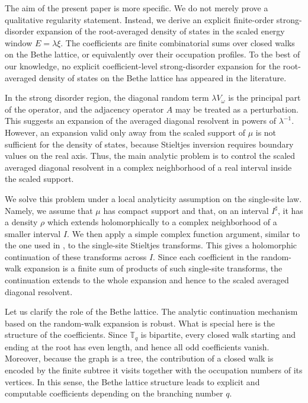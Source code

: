 \documentclass[a4paper,11pt]{article}
\begin{document}
The aim of the present paper is more specific. 
We do not merely prove a qualitative regularity statement. 
Instead, we derive an explicit finite-order strong-disorder expansion of 
the root-averaged density of states in the scaled energy window $E=\lambda\xi$. 
The coefficients are finite combinatorial sums over closed walks on the Bethe lattice, or
equivalently over their occupation profiles. 
To the best of our knowledge, no explicit coefficient-level strong-disorder expansion for
the root-averaged density of states on the Bethe lattice has appeared in the literature.

In the strong disorder region, 
the diagonal random term $\lambda V_\omega$ is the principal part of the operator, 
and the adjacency operator $A$ may be treated as a perturbation. 
This suggests an expansion of the averaged diagonal resolvent in powers of $\lambda^{-1}$.
However, an expansion valid only away from the scaled support of $\mu$ is
not sufficient for the density of states, because Stieltjes inversion
requires boundary values on the real axis. 
Thus, the main analytic problem is to control the scaled averaged diagonal resolvent in a complex
neighborhood of a real interval inside the scaled support.

We solve this problem under a local analyticity assumption on the single-site law. 
Namely, we assume that $\mu$ has compact support and that, 
on an interval $I^\sharp$, it has a density $\rho$ which extends
holomorphically to a complex neighborhood of a smaller interval $I$. 
We then apply a simple complex function argument, similar to the one used in
\cite{KaminagaKrishnaNakamura2012}, to the single-site Stieltjes transforms. 
This gives a holomorphic continuation of these transforms across $I$. 
Since each coefficient in the random-walk expansion is a finite sum of 
products of such single-site transforms, 
the continuation extends to the whole expansion and hence to the scaled averaged diagonal resolvent.

Let us clarify the role of the Bethe lattice. 
The analytic continuation mechanism based on the random-walk expansion is robust. 
What is special here is the structure of the coefficients. 
Since $\mathbb T_q$ is bipartite, every closed walk starting and ending at the root has even
length, and hence all odd coefficients vanish. 
Moreover, because the graph is a tree, the contribution of a closed walk is encoded by the
finite subtree it visits together with the occupation numbers of its vertices. 
In this sense, the Bethe lattice structure leads to explicit
and computable coefficients depending on the branching number $q$.
\end{document}
